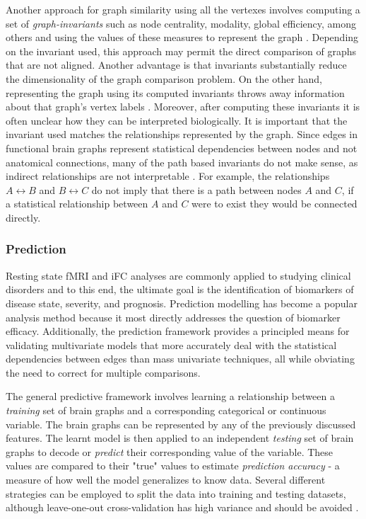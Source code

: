 Another approach for graph similarity using all the vertexes involves computing a set of \emph{graph-invariants} such as node centrality, modality, global efficiency, among others and using the values of these measures to represent the graph \cite{rubinov}\cite{bullmoreReview}. Depending on the invariant used, this approach may permit the direct comparison of graphs that are not aligned. Another advantage is that invariants substantially reduce the dimensionality of the graph comparison problem. On the other hand, representing the graph using its computed invariants throws away information about that graph's vertex labels \cite{Vogelstein2012}. Moreover, after computing these invariants it is often unclear how they can be interpreted biologically. It is important that the invariant used matches the relationships represented by the graph. Since edges in functional brain graphs represent statistical dependencies between nodes and not anatomical connections, many of the path based invariants do not make sense, as indirect relationships are not interpretable \cite{}. For example, the relationships $A \leftrightarrow B$ and $B \leftrightarrow C$ do not imply that there is a path between nodes $A$ and $C$, if a statistical relationship between $A$ and $C$ were to exist they would be connected directly.   

\subsubsection{Prediction}

Resting state fMRI and iFC analyses are commonly applied to studying clinical disorders and to this end, the ultimate goal is the identification of biomarkers of disease state, severity, and prognosis\cite{DiMartino}. Prediction modelling has become a popular analysis method because it most directly addresses the question of biomarker efficacy\cite{craddock,Dosenbach,review}. Additionally, the prediction framework provides a principled means for validating multivariate models that more accurately deal with the statistical dependencies between edges than mass univariate techniques, all while obviating the need to correct for multiple comparisons. 

The general predictive framework involves learning a relationship between a \emph{training} set of brain graphs and a corresponding categorical or continuous variable. The brain graphs can be represented by any of the previously discussed features. The learnt model is then applied to an independent \emph{testing} set of brain graphs to decode or \emph{predict} their corresponding value of the variable. These values are compared to their "true" values to estimate \emph{prediction accuracy} - a measure of how well the model generalizes to know data. Several different strategies can be employed to split the data into training and testing datasets, although leave-one-out cross-validation has high variance and should be avoided \cite{}. 

